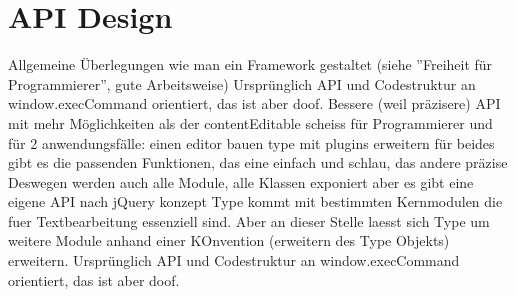 \section{API Design}

Allgemeine Überlegungen wie man ein Framework gestaltet (siehe ''Freiheit für Programmierer'', gute Arbeitsweise)
Ursprünglich API und Codestruktur an window.execCommand orientiert, das ist aber doof.
Bessere (weil präzisere) API mit mehr Möglichkeiten als der contentEditable scheiss
für Programmierer und für 2 anwendungsfälle:
einen editor bauen
type mit plugins erweitern
für beides gibt es die passenden Funktionen, das eine einfach und schlau, das andere präzise
Deswegen werden auch alle Module, alle Klassen exponiert aber es gibt eine eigene API nach jQuery konzept
Type kommt mit bestimmten Kernmodulen die fuer Textbearbeitung essenziell sind. Aber an dieser Stelle laesst sich Type um weitere Module anhand einer KOnvention (erweitern des Type Objekts) erweitern.
Ursprünglich API und Codestruktur an window.execCommand orientiert, das ist aber doof.
